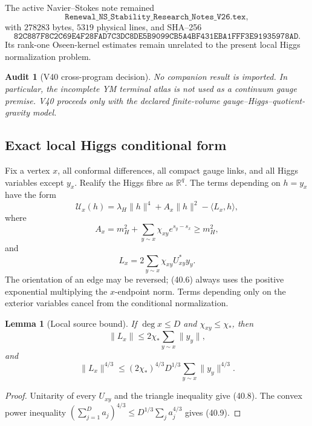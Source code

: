 \documentclass[11pt]{article}
\newtheorem{lemma}[theorem]{Lemma}
\newtheorem{audit}[theorem]{Audit}
\theoremstyle{remark}
\begin{document}
The active Navier--Stokes note remained
\[
 \texttt{Renewal\_NS\_Stability\_Research\_Notes\_V26.tex},     \tag{40.3}
\]
with \(278283\) bytes, \(5319\) physical lines, and SHA--256
\[
 \texttt{82C887F8C2C69E4F28FAD7C3DC8DE5B9099CB5A4BF431EBA1FFF3E91935978AD}.
                                                               \tag{40.4}
\]
Its rank-one Oseen-kernel estimates remain unrelated to the present
local Higgs normalization problem.

\begin{audit}[V40 cross-program decision]
\label{aud:v17v40-companions}
No companion result is imported.  In particular, the incomplete YM
terminal atlas is not used as a continuum gauge premise.  V40 proceeds
only with the declared finite-volume gauge--Higgs--quotient-gravity
model.
\end{audit}

\subsection{Exact local Higgs conditional form}

Fix a vertex \(x\), all conformal differences, all compact gauge links,
and all Higgs variables except \(y_x\).  Realify the Higgs fibre as
\(\mathbb R^q\).  The terms depending on \(h=y_x\) have the form
\[
 \mathcal U_x(h)
 =\lambda_H\|h\|^4+A_x\|h\|^2-\langle L_x,h\rangle,            \tag{40.5}
\]
where
\[
 A_x=m_H^2+
 \sum_{y\sim x}\chi_{xy}e^{s_y-s_x}
 \geq m_H^2,                                       \tag{40.6}
\]
and
\[
 L_x=2\sum_{y\sim x}\chi_{xy}U_{xy}^*y_y.         \tag{40.7}
\]
The orientation of an edge may be reversed; (40.6) always uses the
positive exponential multiplying the \(x\)-endpoint norm.  Terms
depending only on the exterior variables cancel from the conditional
normalization.

\begin{lemma}[Local source bound]
\label{lem:v17v40-source}
If \(\deg x\leq D\) and \(\chi_{xy}\leq\chi_*\), then
\[
 \|L_x\|
 \leq2\chi_*\sum_{y\sim x}\|y_y\|,               \tag{40.8}
\]
and
\[
 \|L_x\|^{4/3}
 \leq(2\chi_*)^{4/3}D^{1/3}
 \sum_{y\sim x}\|y_y\|^{4/3}.                   \tag{40.9}
\]
\end{lemma}

\begin{proof}
Unitarity of every \(U_{xy}\) and the triangle inequality give
(40.8).  The convex power inequality
\((\sum_{j=1}^D a_j)^{4/3}\leq D^{1/3}\sum_j a_j^{4/3}\)
gives (40.9).
\end{proof}
\end{document}
